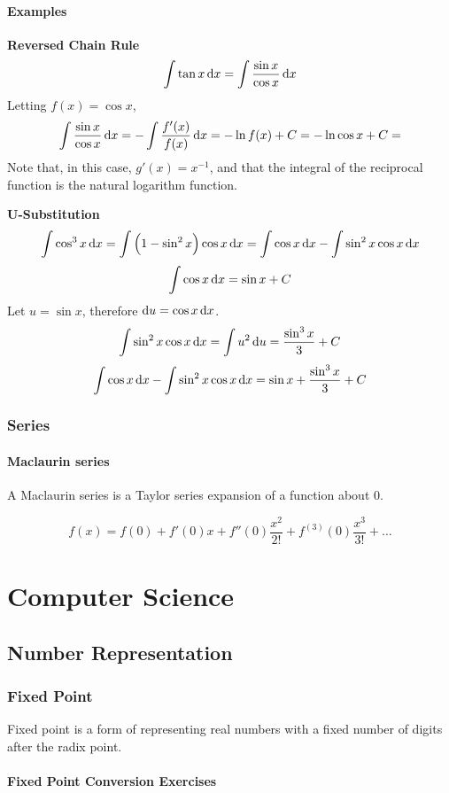 \documentclass[oneside]{book} %
\theoremstyle{plain}
\begin{document}
\subsection{Examples}
\textbf{Reversed Chain Rule}
\[\int \tan x \dif x = \int \frac{\sin{x}}{\cos{x}} \dif x\]
Letting \(f(x) = \cos x\),
\[\int \frac{\sin{x}}{\cos{x}} \dif x = - \int \frac{f'(x)}{f(x)} \dif x
= - \ln{f(x)} + C = - \ln{\cos x} + C = \]
Note that, in this case, \(g'(x) = x^{-1}\), and that the integral of the
reciprocal function is the natural logarithm function.

\textbf{U-Substitution}
\[\int \cos^3 x \dif x
= \int \left( 1 - \sin^2 x \right) \cos x \dif x
= \int \cos x \dif x - \int \sin^2 x \cos x \dif x\]
\[\int \cos x \dif x = \sin x + C\]
Let \(u = \sin x\), therefore \(\dif u = \cos x \dif x\).
\[\int \sin^2 x \cos x \dif x = \int u^2 \dif u = \frac{\sin^3 x}{3} + C\]
\[\int \cos x \dif x - \int \sin^2 x \cos x \dif x
= \sin x + \frac{\sin^3 x}{3} + C\]

\section{Series}
\subsection{Maclaurin series}
A Maclaurin series is a Taylor series expansion of a function about 0.

\[f\left(x\right) = f\left(0\right) + f'\left(0\right)x + f''\left(0\right)\frac{x^2}{2!} + f^{\left( 3 \right)}\left(0\right)\frac{x^3}{3!} + \ldots\]

\part{Computer Science}

\chapter{Number Representation}

\section{Fixed Point}
Fixed point is a form of representing real numbers with a fixed number of digits
after the radix point.

\subsection{Fixed Point Conversion Exercises}
\end{document}
